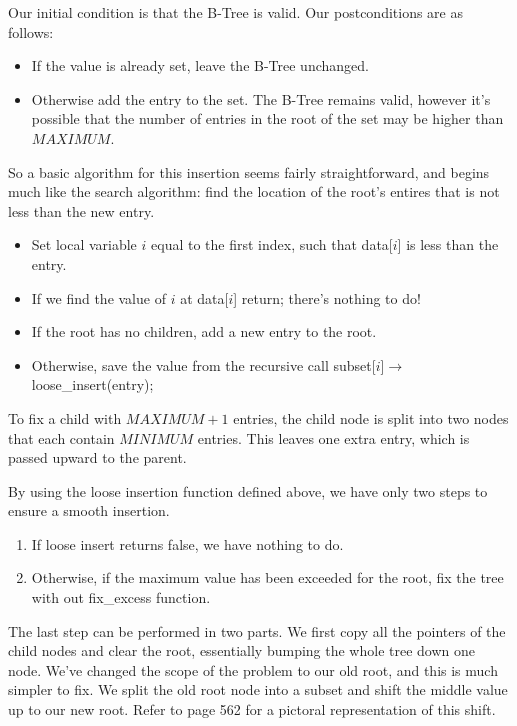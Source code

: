 Our initial condition is that the B-Tree is valid. Our postconditions are as follows:
\begin{itemize}
\item If the value is already set, leave the B-Tree unchanged.
\item Otherwise add the entry to the set. The B-Tree remains valid, however it's possible that the number of entries in the root of the set may be higher than $MAXIMUM$.
\end{itemize}
So a basic algorithm for this insertion seems fairly straightforward, and begins much like the search algorithm: find the location of the root's entires that is not less than the new entry.
\begin{itemize}
\item Set local variable $i$ equal to the first index, such that data[$i$] is less than the entry.
\item If we find the value of $i$ at data[$i$] return; there's nothing to do!
\item If the root has no children, add a new entry to the root.
\item Otherwise, save the value from the recursive call subset[$i$]$\to$loose\_insert(entry); 
\end{itemize}

To fix a child with $MAXIMUM+1$ entries, the child node is split into two nodes that each contain $MINIMUM$ entries. This leaves one extra entry, which is passed upward to the parent.

By using the loose insertion function defined above, we have only two steps to ensure a smooth insertion.
\begin{enumerate}
\item If loose insert returns false, we have nothing to do.
\item Otherwise, if the maximum value has been exceeded for the root, fix the tree with out fix\_excess function.
\end{enumerate}
The last step can be performed in two parts. We first copy all the pointers of the child nodes and clear the root, essentially bumping the whole tree down one node. We've changed the scope of the problem to our old root, and this is much simpler to fix. We split the old root node into a subset and shift the middle value up to our new root. Refer to page 562 for a pictoral representation of this shift.

